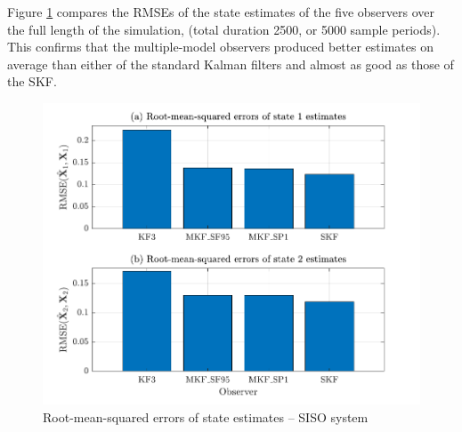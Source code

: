 Figure \ref{fig:rod-obs-sim1-xest-RMSE-bar} compares the \gls{RMSE}s of the state estimates of the five observers over the full length of the simulation, (total duration 2500, or 5000 sample periods). This confirms that the multiple-model observers produced better estimates on average than either of the standard Kalman filters and almost as good as those of the SKF.
\begin{figure}[htp]
	\centering
	\includegraphics[width=12cm]{images/rod_obs_sim1_all_seed_x_err_bar.pdf}
	\caption{Root-mean-squared errors of state estimates – SISO system}
	\label{fig:rod-obs-sim1-xest-RMSE-bar}
\end{figure}


